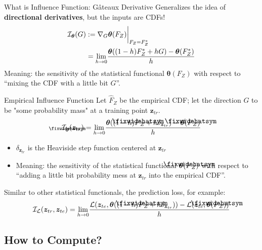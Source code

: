 \documentclass[blue]{beamer}
\newcommand\lowerwidehatsym{%
  \text{\smash{\raisebox{-1.3ex}{%
    $\fixwidehatsym$}}}}
\newcommand\fixwidehat[1]{%
  \mathchoice
    {\accentset{\displaystyle\lowerwidehatsym}{#1}}
    {\accentset{\textstyle\lowerwidehatsym}{#1}}
    {\accentset{\scriptstyle\lowerwidehatsym}{#1}}
    {\accentset{\scriptscriptstyle\lowerwidehatsym}{#1}}
}
\begin{document}
\begin{frame}{What is Influence Function: G\^ateaux Derivative}{}
  Generalizes the idea of \textbf{directional derivatives}, but the inputs are CDFs!
\begin{align}\label{gateaux}
  \mathcal{I}_{\bm{\theta}}(G) &:= \nabla_{G} \bm{\theta}(F_Z)\biggr\rvert_{F_Z=F^*_Z} \notag\\
  &= \underset{h \to 0}{\lim}\frac{\bm{\theta}((1-h)F^*_Z + hG) - \bm{\theta}(F^*_Z)}{h}
\end{align}
Meaning: the sensitivity of the statistical functional $\bm{\theta}(F_Z)$ with respect to ``mixing the CDF with a little bit $G$''.
\end{frame}


\begin{frame}{Empirical Influence Function}{}
Let $\hat{F}_Z$ be the empirical CDF; let the direction $G$ to be "some probability mass" at a training point $\bm{z}_{tr}$.
\begin{align}\label{empinfluence}
  \mathcal{I}_{\fixwidehat{\bm{\theta}}}(\bm{z}_{tr}) = \underset{h \to 0}{\lim}\frac{\bm{\theta}((1-h)\fixwidehat{F}_Z+ h\delta_{\bm{z}_{tr}}) - \bm{\theta}(\fixwidehat{F}_Z)}{h}
\end{align}
\begin{itemize}
  \item $\delta_{\bm{z}_{tr}}$ is the Heaviside step function centered at $\bm{z}_{tr}$
  \item Meaning: the sensitivity of the statistical functional $\bm{\theta}(\fixwidehat{F}_Z)$ with respect to ``adding a little bit probability mess at $\bm{z}_{tr}$ into the empirical CDF''.
\end{itemize}
Similar to other statistical functionals, the prediction loss, for example:
    \begin{align}\label{lossinfluence}
  \mathcal{I}_{\mathcal{L}}(\bm{z}_{tr}, \bm{z}_{te}) = \underset{h \to 0}{\lim}\frac{\mathcal{L}(\bm{z}_{te}, \bm{\theta}((1-h)\fixwidehat{F}_Z + h\delta_{\bm{z}_{tr}})) - \mathcal{L}(\bm{z}_{te}, \bm{\theta}(\fixwidehat{F}_Z))}{h}
    \end{align}
\end{frame}




\subsection{How to Compute?}
\end{document}
